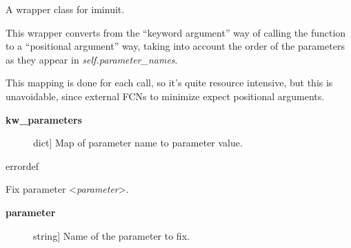 \documentclass[a4paper,10pt,english]{sphinxmanual}
\begin{document}
\begin{fulllineitems}
\label{index:kafe.iminuit_wrapper.IMinuit}
A wrapper class for iminuit.

\begin{fulllineitems}
\label{index:kafe.iminuit_wrapper.IMinuit.FCN_wrapper}
This wrapper converts from the ``keyword argument'' way of calling the
function to a ``positional argument'' way, taking into account the order
of the parameters as they appear in \emph{self.parameter\_names}.

This mapping is done for each call, so it's quite resource intensive,
but this is unavoidable, since external FCNs to minimize expect
positional arguments.
\begin{description}
\item[{\textbf{kw\_parameters}}] \leavevmode{[}dict{]}
Map of parameter name to parameter value.

\end{description}

\end{fulllineitems}


\begin{fulllineitems}
\label{index:kafe.iminuit_wrapper.IMinuit.errordef}
 errordef

\end{fulllineitems}


\begin{fulllineitems}
\label{index:kafe.iminuit_wrapper.IMinuit.fix_parameter}
Fix parameter \textless{}\emph{parameter}\textgreater{}.
\begin{description}
\item[{\textbf{parameter}}] \leavevmode{[}string{]}
Name of the parameter to fix.

\end{description}


\end{fulllineitems}
\end{fulllineitems}
\end{document}
